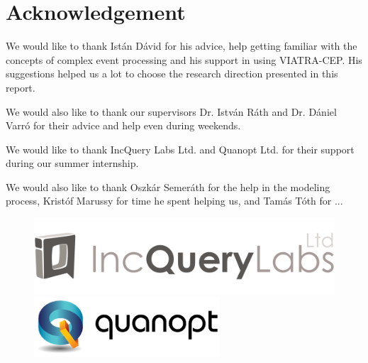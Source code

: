 \chapter*{Acknowledgement}
\label{chap:acknowledge}

We would like to thank Istán Dávid for his advice, help getting familiar with the concepts of complex event processing and his support in using VIATRA-CEP.
His suggestions helped us a lot to choose the research direction presented in this report.

We would also like to thank our supervisors Dr. István Ráth and Dr. Dániel Varró
for their advice and help even during weekends. 

We would like to thank IncQuery Labs Ltd. and Quanopt Ltd. for their support during our summer internship.

We would also like to thank Oszkár Semeráth for the help in the modeling process, Kristóf Marussy for time he spent helping us, and Tamás Tóth for ...
\vspace{5ex}
\noindent\begin{figure}[h]
	\begin{minipage}{0.49\linewidth}
		\centering
		\includegraphics[width=0.8\linewidth]{include/figures/incquerylabs}
	\end{minipage}
	\begin{minipage}{0.49\linewidth}
		\centering
		\includegraphics[width=0.8\linewidth]{include/figures/quanopt}
	\end{minipage}
\end{figure}